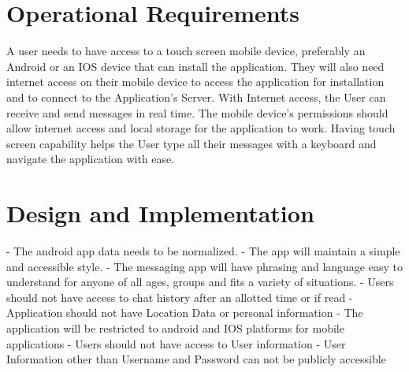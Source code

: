 \documentclass[11pt]{article}
\theoremstyle{plain}
\theoremstyle{definition}
\begin{document}
\section{Operational Requirements}\label{sec:operationalrequirements}
A user needs to have access to a touch screen mobile device, preferably an Android or an IOS device that can install the application. They will also need  internet access on their mobile device to access the application for installation and to connect to the Application's Server. With Internet access, the User can receive and send messages in real time. The mobile device’s permissions should allow internet access and local storage for the application to work. Having touch screen capability helps the User type all their messages with a keyboard and navigate the application with ease.

\section{Design and Implementation}\label{sec:designandimplementationrequirements}
- The android app data needs to be normalized. \newline
- The app will maintain a simple and accessible style. \newline
- The messaging app will have phrasing and language easy to understand for anyone of all 
  ages, groups and fits a variety of situations. \newline
- Users should not have access to chat history after an allotted time or if read \newline
- Application should not have Location Data or personal information \newline
- The application will be restricted to android and IOS platforms for mobile applications \newline
- Users should not have access to User information \newline
- User Information other than Username and Password can not be publicly accessible \newline
\end{document}
